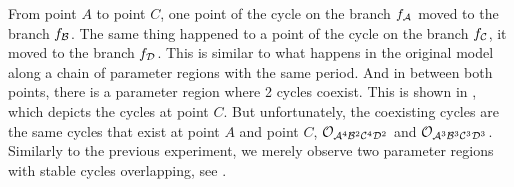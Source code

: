 From point $A$ to point $C$, one point of the cycle on the branch $f_{\mathcal{A}}$ moved to the branch $f_{\mathcal{B}}$.
The same thing happened to a point of the cycle on the branch $f_{\mathcal{C}}$, it moved to the branch $f_{\mathcal{D}}$.
This is similar to what happens in the original model along a chain of parameter regions with the same period.
And in between both points, there is a parameter region where 2 cycles coexist.
This is shown in , which depicts the cycles at point $C$.
But unfortunately, the coexisting cycles are the same cycles that exist at point $A$ and point $C$, $\mathcal{O}_{\mathcal{A}^4\mathcal{B}^2\mathcal{C}^4\mathcal{D}^2}$ and $\mathcal{O}_{\mathcal{A}^3\mathcal{B}^3\mathcal{C}^3\mathcal{D}^3}$.
Similarly to the previous experiment, we merely observe two parameter regions with stable cycles overlapping, see .
